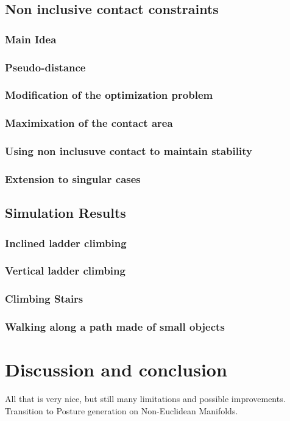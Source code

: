 \subsection{Non inclusive contact constraints}
\subsubsection{Main Idea}
\subsubsection{Pseudo-distance}
\subsubsection{Modification of the optimization problem}
\subsubsection{Maximixation of the contact area}
\subsubsection{Using non inclusuve contact to maintain stability}
\subsubsection{Extension to singular cases}
\subsection{Simulation Results}
\subsubsection{Inclined ladder climbing}
\subsubsection{Vertical ladder climbing}
\subsubsection{Climbing Stairs}
\subsubsection{Walking along a path made of small objects}


\section{Discussion and conclusion}
All that is very nice, but still many limitations and possible improvements.
Transition to Posture generation on Non-Euclidean Manifolds.
